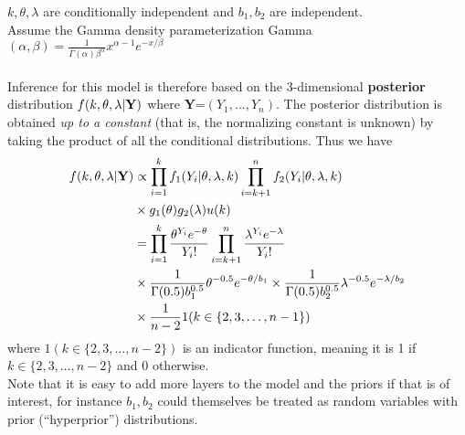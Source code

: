\documentclass[11pt]{article}
\begin{document}
$k,\theta,\lambda$ are conditionally independent and $b_1,b_2$ are
independent. \\ Assume the Gamma density parameterization
Gamma$(\alpha,\beta) = \frac{1}{\Gamma(\alpha)\beta^{\alpha}}
x^{\alpha-1} e^{-x/\beta}$\\\\
Inference for this model is therefore based on the 3-dimensional {\bf
  posterior} distribution $f(k,\theta,\lambda| {\bf Y})$ where
{\bf Y}=$(Y_1,\dots,Y_n)$. The posterior distribution is obtained {\it
  up to a constant} (that is, the normalizing constant is unknown) by
taking the product of all the conditional distributions. Thus we have
\begin{equation*}
\begin{split}
f(k,\theta,\lambda| {\bf Y}) & \propto \prod_{i=1}^k f_1(Y_i|\theta,\lambda,k) \prod_{i=k+1}^n f_2(Y_i|\theta,\lambda,k)\\
& \times g_1(\theta) g_2(\lambda) u(k)\\
& = \prod_{i=1}^k \frac{\theta^{Y_i} e^{-\theta}}{Y_i !} \prod_{i=k+1}^n \frac{\lambda^{Y_i} e^{-\lambda}}{Y_i !} \\
& \times  \frac{1}{\Gamma(0.5)b_1^{0.5}} \theta^{-0.5} e^{-\theta/b_1} \times \frac{1}{\Gamma(0.5)b_2^{0.5}} \lambda^{-0.5} e^{-\lambda/b_2}\\ 
& \times \frac{1}{n-2} 1(k\in \{2,3,\dots, n-1 \})
\end{split}
\end{equation*}
where $1 (k\in \{2,3,\dots, n-2\}) $ is an indicator function, meaning it is
1 if $k \in \{2,3,\dots, n-2\}$ and 0 otherwise.\\

Note that it is easy to add more layers to the model and the
priors if that is of interest, for instance $b_1,b_2$ could themselves
be treated as random variables with prior (``hyperprior'')
distributions. 

\end{document}
